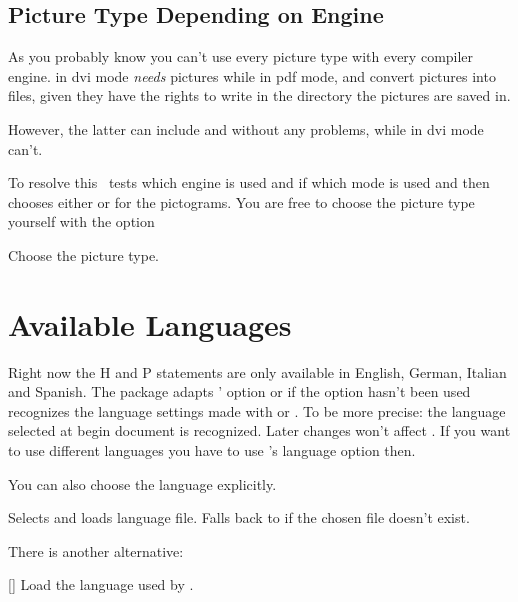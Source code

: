 \documentclass[load-preamble+]{cnltx-doc}
\begin{document}
\subsection{Picture Type Depending on Engine}\label{ssec:picture_type}
As you probably know you can't use every picture type with every compiler
engine.  \pdfTeX{} in \acs{dvi} mode \emph{needs}  pictures while
\pdfTeX{} in \acs{pdf} mode, \XeTeX{} and \LuaTeX{} convert 
pictures into  files, given they have the rights to write in the
directory the pictures are saved in.

However, the latter can include  and  without any
problems, while \pdfTeX{} in \acs{dvi} mode can't.

To resolve this \ghsystem\ tests which engine is used and if \pdfTeX{} which
mode is used and then chooses either  or  for the
pictograms.  You are free to choose the picture type yourself with the option
\begin{options}
    Choose the picture type.
\end{options}

\section{Available Languages}\label{sec:ghsystem_language}
Right now the H and P statements are only available in English, German,
Italian and Spanish.  The package adapts \chemmacros' option 
or if the option hasn't been used recognizes the language settings made with
 or .  To be more precise: the language selected
at begin document is recognized.  Later changes won't affect \ghsystem.  If
you want to use different languages you have to use \ghsystem's language
option then.

You can also choose the language explicitly.
\begin{options}
    Selects and loads language file.  Falls back to  if the
    chosen file doesn't exist.
\end{options}
\begin{example}

\end{example}

There is another alternative:
\begin{commands}
  []
    Load the language used by \ghsystem.
\end{commands}
\end{document}
